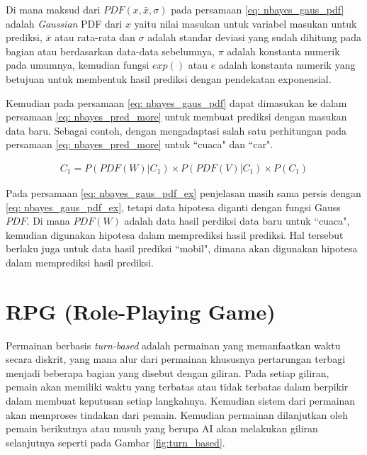 \begin{subs}
\begin{enumerate}[label=\textbf{\arabic*).}]
		Di mana maksud dari $PDF(x, \bar{x}, \sigma)$ pada persamaan \ref{eq: nbayes_gaus_pdf} adalah \textit{Gaussian} PDF dari $x$ yaitu nilai masukan untuk variabel masukan untuk prediksi, $\bar x$ atau rata-rata dan $\sigma$ adalah standar deviasi yang sudah dihitung pada bagian atau berdasarkan data-data sebelumnya, $\pi$ adalah konstanta numerik pada umumnya, kemudian fungsi $exp()$ atau $e$ adalah konstanta numerik yang betujuan untuk membentuk hasil prediksi dengan pendekatan exponensial.
		\vspace{1ex}
		
		Kemudian pada persamaan \ref{eq: nbayes_gaus_pdf} dapat dimasukan ke dalam persamaan \ref{eq: nbayes_pred_more} untuk membuat prediksi dengan masukan data baru. Sebagai contoh, dengan mengadaptasi salah satu perhitungan pada persamaan \ref{eq: nbayes_pred_more} untuk ``cuaca" dan ``car".
		
		\begin{equation}\label{eq: nbayes_gaus_pdf_ex}
		\begin{split}
		C_{1} = P(PDF(W)|C_{1}) \times P(PDF(V)|C_{1}) \times P(C_{1})
		\end{split}
		\end{equation}
		
		Pada persamaan \ref{eq: nbayes_gaus_pdf_ex} penjelasan masih sama persis dengan \ref{eq: nbayes_gaus_pdf_ex}, tetapi data hipotesa diganti dengan fungsi Gauss $PDF$. Di mana $PDF(W)$ adalah data hasil perdiksi data baru untuk ``cuaca", kemudian digunakan hipotesa dalam memprediksi hasil prediksi. Hal tersebut berlaku juga untuk data hasil prediksi ``mobil", dimana akan digunakan hipotesa dalam memprediksi hasil prediksi.
	\end{enumerate}
\end{subs}

\section{RPG (Role-Playing Game)}
\label{sec:sec2_turn_based_rpg}
\vspace{1ex}

Permainan berbasis \textit{turn-based} \citep{Panumate2015} adalah permainan yang memanfaatkan waktu secara diskrit, yang mana alur dari permainan khususnya pertarungan terbagi menjadi beberapa bagian yang disebut dengan giliran. Pada setiap giliran, pemain akan memiliki waktu yang terbatas atau tidak terbatas dalam berpikir dalam membuat keputusan setiap langkahnya. Kemudian sistem dari permainan akan memproses tindakan dari pemain. Kemudian permainan dilanjutkan oleh pemain berikutnya atau musuh yang berupa AI akan melakukan giliran selanjutnya seperti pada Gambar \ref{fig:turn_based}.
\vspace{1ex}

